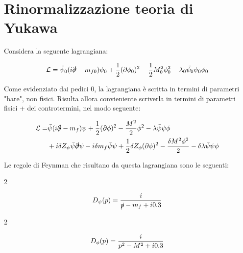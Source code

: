 \documentclass[11pt]{report}
\begin{document}
\newpage

\section{Rinormalizzazione teoria di Yukawa}

Considera la seguente lagrangiana: 

\begin{align}
    \mathcal{L} = \bar{\psi}_0 (i\slashed{\partial} - m_{f0})\psi_0 + \frac{1}{2}(\partial\phi_0)^2 - \frac{1}{2}M_0^2\phi_0^2 - \lambda_0\bar{\psi_0}\psi_0 \phi_0
\end{align}

Come evidenziato dai pedici 0, la lagrangiana è scritta in termini di parametri "bare", non fisici. Risulta allora convieniente scriverla in termini di parametri fisici + dei controtermini, nel modo seguente: 

\begin{align}
    \mathcal{L} = &\bar{\psi}(i\slashed{\partial}-m_f)\psi + \frac{1}{2}(\partial\phi)^2 - \frac{M^2}{2}\phi^2 - \lambda \bar{\psi}\psi \phi \notag \\
    &+i\delta Z_\psi\bar{\psi}\slashed{\partial}\psi -i\delta m_f \bar{\psi}\psi + \frac{1}{2}\delta Z_\phi(\partial\phi)^2 - \frac{\delta M^2\phi^2}{2} - \delta \lambda \bar{\psi}\psi \phi 
\end{align}

Le regole di Feynman che risultano da questa lagrangiana sono le seguenti: 

\begin{multicols}{2}
    \begin{center}
    \end{center}
    \columnbreak
    \begin{align}
        D_\psi(p) = \frac{i}{\slashed{p} - m_f + i0.3} 
    \end{align}
\end{multicols}

\begin{multicols}{2}
    \begin{center}
    \end{center}
    \columnbreak
    \begin{align}
        D_\phi(p) = \frac{i}{p^2 - M^2 + i0.3} 
    \end{align}
\end{multicols}
\end{document}
